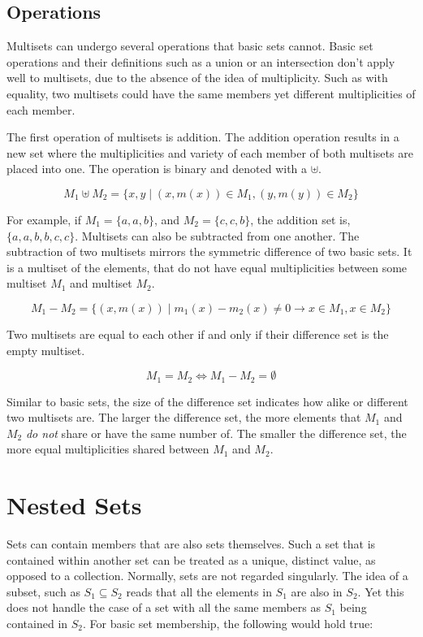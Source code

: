 \subsection{Operations}

Multisets can undergo several operations that basic sets cannot. Basic set operations and their definitions such as a union or an intersection don't apply well to multisets, due to the absence of the idea of multiplicity. Such as with equality, two multisets could have the same members yet different multiplicities of each member.

The first operation of multisets is addition. The addition operation results in a new set where the multiplicities and variety of each member of both multisets are placed into one. The operation is binary and denoted with a $\uplus$.

$$
M_1 \uplus M_2 = \{ x, y \mid (x, m(x)) \in M_1, (y, m(y)) \in M_2 \}
$$

For example, if $M_1 = \{a, a, b\}$, and $M_2 = \{c, c, b\}$, the addition set is, $\{a, a, b, b, c, c\}$. Multisets can also be subtracted from one another. The subtraction of two multisets mirrors the symmetric difference of two basic sets. It is a multiset of the elements, that do not have equal multiplicities between some multiset $M_1$ and multiset $M_2$.

$$
M_1 - M_2 = \{ (x, m(x)) \mid m_1(x) - m_2(x) \neq 0 \rightarrow x \in M_1, x \in M_2 \}
$$

Two multisets are equal to each other if and only if their difference set is the empty multiset.

$$
M_1 = M_2 \iff M_1 - M_2 = \emptyset
$$

Similar to basic sets,  the size of the difference set indicates how alike or different two multisets are. The larger the difference set, the more elements that $M_1$ and $M_2$ \textit{do not} share or have the same number of. The smaller the difference set, the more equal multiplicities shared between $M_1$ and $M_2$.

\section{Nested Sets}

Sets can contain members that are also sets themselves. Such a set that is contained within another set can be treated as a unique, distinct value, as opposed to a collection. Normally, sets are not regarded singularly. The idea of a subset, such as $S_1 \subseteq S_2$ reads that all the elements in $S_1$ are also in $S_2$. Yet this does not handle the case of a set with all the same members as $S_1$ being contained in $S_2$. For basic set membership, the following would hold true:


